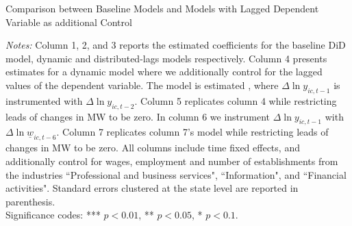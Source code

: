 \begin{table}[h!]\centering
	\caption{Comparison between Baseline Models and Models with Lagged Dependent 
	Variable as additional Control}
	\label{tab:horse_race_ab}
	\resizebox{\textwidth}{!}{
		
	}
	\begin{minipage}{\textwidth} \footnotesize
		\vspace{3mm} 
		\textit{Notes:} Column 1, 2, and 3 reports the estimated coefficients for the baseline
		DiD model, dynamic and distributed-lags models respectively. Column 4 presents estimates
		for a dynamic model where we additionally control for the lagged values of the dependent 
		variable. The model is estimated \textcite{ArellanoBond1991}, where $\Delta \ln y_{ic, t-1}$ is 
		instrumented with $\Delta \ln y_{ic, t-2}$. Column 5 replicates column 4 while 
		restricting leads of changes in MW to be zero. In column 6 we instrument   $\Delta \ln y_{ic, t-1}$ 
		with $\Delta \ln \underline{w}_{ic, t-6}$. Column 7 replicates column 7's model while 
		restricting leads of changes in MW to be zero. All columns include time fixed effects, 
		and additionally control for wages, employment and number of establishments from the 
		industries ``Professional and business services", ``Information", and ``Financial activities".
		Standard errors clustered at the state level are
		reported in parenthesis. \\
		Significance codes: *** $p < 0.01$, ** $p < 0.05$, * $p < 0.1$.
	\end{minipage}
\end{table}


%    

